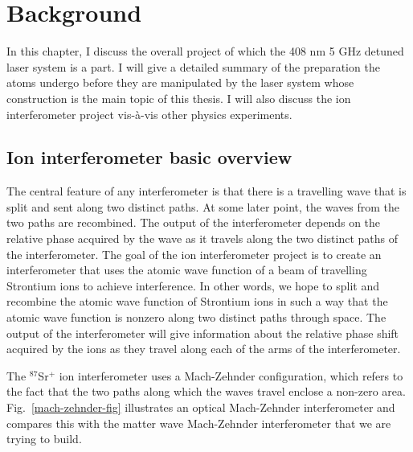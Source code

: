 
\chapter{Background}
In this chapter, I discuss the overall project of which the 408 nm 5 GHz detuned laser system is a part. I will give a detailed summary of the preparation the atoms undergo before they are manipulated by the laser system whose construction is the main topic of this thesis. I will also discuss the ion interferometer project vis-\`a-vis other physics experiments.

\section{Ion interferometer basic overview}
The central feature of any interferometer is that there is a travelling wave that is split and sent along two distinct paths. At some later point, the waves from the two paths are recombined. The output of the interferometer depends on the relative phase acquired by the wave as it travels along the two distinct paths of the interferometer.
The goal of the ion interferometer project is to create an interferometer that uses the atomic wave function of a beam of travelling Strontium ions to achieve interference.
In other words, we hope to split and recombine the atomic wave function of Strontium ions in such a way that the atomic wave function is nonzero along two distinct paths through space. 
The output of the interferometer will give information about the relative phase shift acquired by the ions as they travel along each of the arms of the interferometer. 

The $^{87}$Sr$^+$ ion interferometer uses a Mach-Zehnder configuration, which refers to the fact that the two paths along which the waves travel enclose a non-zero area. Fig.\ \ref{mach-zehnder-fig} illustrates an optical Mach-Zehnder interferometer and compares this with the matter wave Mach-Zehnder interferometer that we are trying to build.

